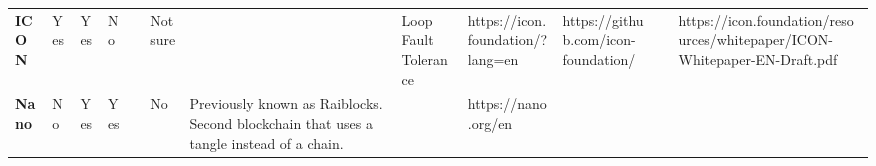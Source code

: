 \begin{table}[htbp]
\begin{adjustbox}{width=25cm, height=6cm, angle=270}
\begin{tabular}{llllrlp{17.915em}rlrrr}
      \rowcolor[rgb]{ .267,  .447,  .769} \textcolor[rgb]{ 1,  1,  1}{\textbf{ICON}} & \cellcolor[rgb]{ .776,  .937,  .808}\textcolor[rgb]{ 0,  .38,  0}{Yes} & \cellcolor[rgb]{ .776,  .937,  .808}\textcolor[rgb]{ 0,  .38,  0}{Yes} & \cellcolor[rgb]{ 1,  .78,  .808}\textcolor[rgb]{ .612,  0,  .024}{No} & \cellcolor[rgb]{ 1,  1,  1}\textcolor[rgb]{ .188,  .329,  .588}{} & \cellcolor[rgb]{ 1,  .922,  .612}\textcolor[rgb]{ .612,  .341,  0}{Not sure} & \multicolumn{1}{r}{\cellcolor[rgb]{ 1,  1,  1}\textcolor[rgb]{ .188,  .329,  .588}{}} & \multicolumn{1}{l}{\cellcolor[rgb]{ 1,  1,  1}\textcolor[rgb]{ .188,  .329,  .588}{Loop Fault Tolerance}} & \cellcolor[rgb]{ 1,  1,  1}\textcolor[rgb]{ .188,  .329,  .588}{https://icon.foundation/?lang=en} & \multicolumn{1}{l}{\cellcolor[rgb]{ 1,  1,  1}\textcolor[rgb]{ .188,  .329,  .588}{https://github.com/icon-foundation/}} & \cellcolor[rgb]{ 1,  1,  1}\textcolor[rgb]{ .188,  .329,  .588}{} & \multicolumn{1}{l}{\cellcolor[rgb]{ 1,  1,  1}\textcolor[rgb]{ .188,  .329,  .588}{https://icon.foundation/resources/whitepaper/ICON-Whitepaper-EN-Draft.pdf}} \\
      \rowcolor[rgb]{ .267,  .447,  .769} \textcolor[rgb]{ 1,  1,  1}{\textbf{Nano}} & \cellcolor[rgb]{ 1,  .78,  .808}\textcolor[rgb]{ .612,  0,  .024}{No} & \cellcolor[rgb]{ .776,  .937,  .808}\textcolor[rgb]{ 0,  .38,  0}{Yes} & \cellcolor[rgb]{ .776,  .937,  .808}\textcolor[rgb]{ 0,  .38,  0}{Yes} & \cellcolor[rgb]{ 1,  1,  1}\textcolor[rgb]{ .188,  .329,  .588}{} & \cellcolor[rgb]{ 1,  .78,  .808}\textcolor[rgb]{ .612,  0,  .024}{No} & \cellcolor[rgb]{ .851,  .882,  .949}\textcolor[rgb]{ .188,  .329,  .588}{Previously known as Raiblocks. Second blockchain that uses a tangle instead of a chain.} & \cellcolor[rgb]{ 1,  1,  1}\textcolor[rgb]{ .188,  .329,  .588}{} & \cellcolor[rgb]{ 1,  1,  1}\textcolor[rgb]{ .188,  .329,  .588}{https://nano.org/en} & \cellcolor[rgb]{ 1,  1,  1}\textcolor[rgb]{ .188,  .329,  .588}{} & \cellcolor[rgb]{ 1,  1,  1}\textcolor[rgb]{ .188,  .329,  .588}{} & \cellcolor[rgb]{ 1,  1,  1}\textcolor[rgb]{ .188,  .329,  .588}{} \\
      \cmidrule{2-6}\cmidrule{8-12}    
    \end{tabular}
  \end{adjustbox}
  \label{bijlage_selectie_implementatie}
\end{table}



